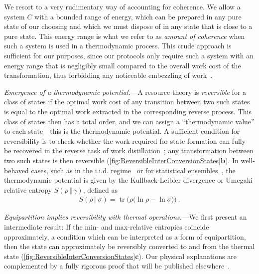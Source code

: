 \documentclass[prl,reprint,longbibliography,superscriptaddress]{revtex4-1}
\renewcommand\paragraph[1]{\par\emph{#1.---}\kern2pt\relax\ignorespaces}
\begin{document}
We resort to a very rudimentary way of accounting for coherence.  We allow a
system $C$ with a bounded range of energy, which can be prepared in any pure
state of our choosing and which we must dispose of in any state that is close to
a pure state.  This energy range is what we refer to as \emph{amount of
  coherence} when such a system is used in a thermodynamic process.  This crude
approach is sufficient for our purposes, since our protocols only require such a
system with an energy range that is negligibly small compared to the overall
work cost of the transformation, thus forbidding any noticeable embezzling of
work~\cite{Brandao2015PNAS_secondlaws}.



\paragraph{Emergence of a thermodynamic potential}A resource theory is
\emph{reversible} for a class of states if the optimal work cost of any
transition between two such states is equal to the optimal work extracted in the
corresponding reverse process.  This class of states then has a total order, and
we can assign a ``thermodynamic value'' to each state---this is the
thermodynamic potential.
A sufficient condition for reversibility is to check whether the work required
for state formation can fully be recovered in the reverse task of work
distillation~\cite{Horodecki2013_ThermoMaj}; any transformation between two such
states is then reversible
(\cref{fig:ReversibleInterConversionStates}\textbf{b}).
In well-behaved cases, such as in the i.i.d.\@
regime~\cite{Brandao2013_resource} or for statistical
ensembles~\cite{Weilenmann2018_smooth}, the thermodynamic potential is
given by the Kullback-Leibler divergence or Umegaki relative entropy
${S}(\rho\,\Vert\,\gamma)$, defined as
\begin{align}
  {S}(\rho\,\Vert\,\sigma) = \operatorname{tr}\bigl( \rho\bigl(\ln\rho - \ln\sigma\bigr) \bigr)\ .
  \label{eq:KL-div-defn}
\end{align}

\paragraph{Equipartition implies reversibility with thermal operations}We first present an intermediate result: If the min- and max-relative entropies
coincide approximately, a condition which can be interpreted as a form of
equipartition, then the state can approximately be reversibly converted to and
from the thermal state (\cref{fig:ReversibleInterConversionStates}\textbf{c}).
Our physical explanations are complemented by a fully rigorous proof that will
be published elsewhere~\cite{Sagawa-CMP-inprep}.
\end{document}
